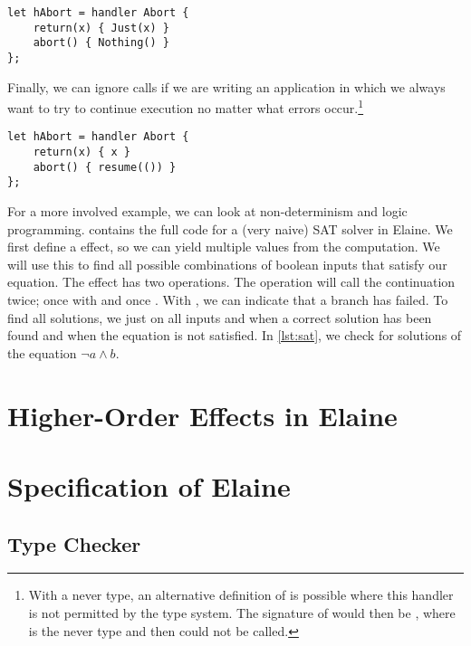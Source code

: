 \begin{lstlisting}[language=elaine, style=fancy]
let hAbort = handler Abort {
    return(x) { Just(x) }
    abort() { Nothing() }
};
\end{lstlisting}

Finally, we can ignore  calls if we are writing an application in which we always want to try to continue execution no matter what errors occur.\footnote{With a never type, an alternative definition of  is possible where this handler is not permitted by the type system. The signature of  would then be , where \el{!} is the never type and then  could not be called.}

\begin{lstlisting}[language=elaine, style=fancy]
let hAbort = handler Abort {
    return(x) { x }
    abort() { resume(()) }
};
\end{lstlisting}

For a more involved example, we can look at non-determinism and logic programming.  contains the full code for a (very naive) SAT solver in Elaine. We first define a  effect, so we can yield multiple values from the computation. We will use this to find all possible combinations of boolean inputs that satisfy our equation. The  effect has two operations. The  operation will call the continuation twice; once with  and once . With , we can indicate that a branch has failed. To find all solutions, we just  on all inputs and  when a correct solution has been found and  when the equation is not satisfied. In \cref{lst:sat}, we check for solutions of the equation $\neg a \wedge b$.



\section{Higher-Order Effects in Elaine}

\section{Specification of Elaine}
\subsection{Type Checker}\label{sec:typechecker}
